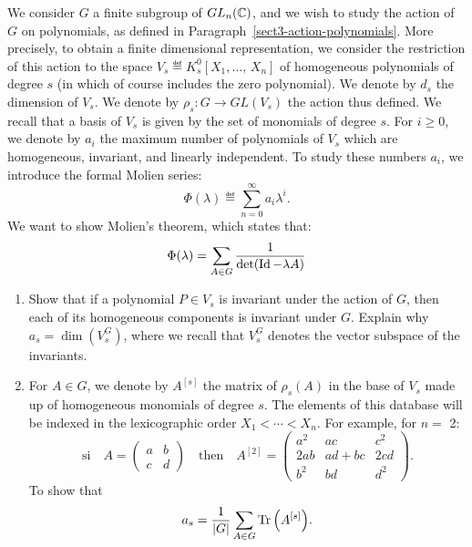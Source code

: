 \begin{exo}
 We consider $G$ a finite subgroup of $ GL_n (\mathbb{C}) $, and we wish to study the action of $G$ on polynomials, as defined in Paragraph~\ref{sect3-action-polynomials}. More precisely, to obtain a finite dimensional representation, we consider the restriction of this action to the space $ V_s \eqdef K_s^0 [X_1, \ldots, \, X_n] $ of homogeneous polynomials of degree $ s $ (in which of course includes the zero polynomial). We denote by $ d_s $ the dimension of $ V_s $. We denote by $ \rho_s: G \rightarrow GL (V_s) $ the action thus defined. We recall that a basis of $ V_s $ is given by the set of monomials of degree $ s $. For $ i \geq 0 $, we denote by $ a_i $ the maximum number of polynomials of $ V_s $ which are homogeneous, invariant, and linearly independent. To study these numbers $ a_i $, we introduce the formal Molien series:
\begin{equation*}
\Phi (\lambda) \eqdef \sum_{n = 0}^{\infty}{a_i \lambda^i}.
\end{equation*}
We want to show Molien's theorem, which states that:
\begin{equation}
\label{eq-thm-molien}
\Phi (\lambda) = \sum_{A \in G}{\frac{1}{\det (\operatorname{Id} - \lambda A)}}
\end{equation}
\begin{enumerate}
\item Show that if a polynomial $ P \in V_s $ is invariant under the action of $G$, then each of its homogeneous components is invariant under $G$. Explain why $ a_s = \dim (V_s^G) $, where we recall that $ V_s^G $ denotes the vector subspace of the invariants.
\item For $ A \in G $, we denote by $ A^{[s]} $ the matrix of $ \rho_s (A) $ in the base of $ V_s $ made up of homogeneous monomials of degree $ s $. The elements of this database will be indexed in the lexicographic order $ X_1 <\cdots <X_n $. For example, for $ n = $ 2:
\begin{equation*}
\text{si} \quad A = \begin{pmatrix} a & b \\c & d \end{pmatrix} \quad \text{then} \quad A^{[2]} = \begin{pmatrix} a^2 & ac & c^2 \\2 ab & ad + bc & 2 cd \\b^2 & bd & d^2 \end{pmatrix}.
\end{equation*}
To show that
\begin{equation*}
a_s = \frac{1}{|G|} \sum_{A \in G}{\operatorname{Tr} \left(A^{[s]} \right)}.
\end{equation*}
 

\end{enumerate}
\end{exo}
